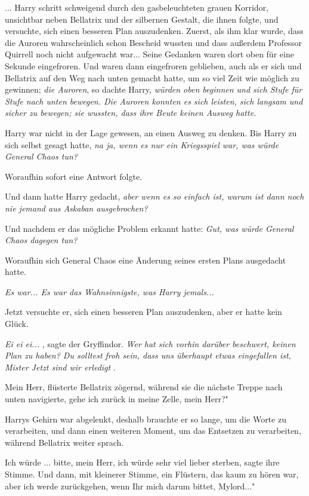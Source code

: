 ... Harry schritt schweigend durch den gasbeleuchteten grauen Korridor,
unsichtbar neben Bellatrix und der silbernen Gestalt, die ihnen folgte, und
versuchte, sich einen besseren Plan auszudenken. Zuerst, als ihm klar wurde,
dass die Auroren wahrscheinlich schon Bescheid wussten und dass außerdem
Professor Quirrell noch nicht aufgewacht war... Seine Gedanken waren dort oben
für eine Sekunde eingefroren. Und waren dann eingefroren geblieben, auch als er
sich und Bellatrix auf den Weg nach unten gemacht hatte, um so viel Zeit wie
möglich zu gewinnen; \emph{die Auroren}, so dachte Harry, \emph{würden oben
beginnen und sich Stufe für Stufe nach unten bewegen. Die Auroren konnten es
sich leisten, sich langsam und sicher zu bewegen; sie wussten, dass ihre Beute
keinen Ausweg hatte.}

Harry war nicht in der Lage gewesen, an einen Ausweg zu denken. Bis Harry zu
sich selbst gesagt hatte, \emph{na ja, wenn es nur ein Kriegsspiel war, was
würde General Chaos tun?}

Woraufhin sofort eine Antwort folgte.

Und dann hatte Harry gedacht,\emph{ aber wenn es so einfach ist, warum ist dann
noch nie jemand aus Askaban ausgebrochen?}

Und nachdem er das mögliche Problem erkannt hatte: \emph{Gut, was würde General
Chaos dagegen tun?}

Woraufhin sich General Chaos eine Änderung seines ersten Plans ausgedacht hatte.

\emph{Es war... Es war das Wahnsinnigste, was Harry jemals...}

Jetzt versuchte er, sich einen besseren Plan auszudenken, aber er hatte kein
Glück.

\emph{ \glqq Ei ei ei...\grqq{} }, sagte der Gryffindor. \emph{Wer hat sich
vorhin darüber beschwert, keinen Plan zu haben? Du solltest froh sein, dass uns
überhaupt etwas eingefallen ist, Mister \glqq Jetzt sind wir erledigt\grqq{} }.

\glqq Mein Herr\grqq{}, flüsterte Bellatrix zögernd, während sie die nächste
Treppe nach unten navigierte, \glqq gehe ich zurück in meine Zelle, mein Herr?"

Harrys Gehirn war abgelenkt, deshalb brauchte er so lange, um die Worte zu
verarbeiten, und dann einen weiteren Moment, um das Entsetzen zu verarbeiten,
während Bellatrix weiter sprach.

\glqq Ich würde ... bitte, mein Herr, ich würde sehr viel lieber sterben\grqq{},
sagte ihre Stimme. Und dann, mit kleinerer Stimme, ein Flüstern, das kaum zu
hören war, \glqq aber ich werde zurückgehen, wenn Ihr mich darum bittet,
Mylord..."

